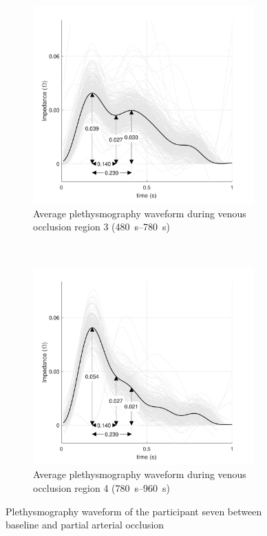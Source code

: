 \begin{figure}[!htbp]
	\centering
	\begin{subfigure}[t]{0.5\textwidth}
		\centering
		\includegraphics[height=7.6cm]{figure8a}
		\caption{Average plethysmography waveform during venous occlusion region 3 (\SIrange{480}{780}{\second})}
		\label{fig:iPG_arterial_baseline}
	\end{subfigure}%
	~ 
	\begin{subfigure}[t]{0.5\textwidth}
		\centering
		\includegraphics[height=7.6cm]{figure8b}
		\caption{Average plethysmography waveform during venous occlusion region 4 (\SIrange{780}{960}{\second})}
		\label{fig:iPG_arterial_occlusion}
	\end{subfigure}
	\caption{Plethysmography waveform of the participant seven between baseline and partial arterial occlusion}
	\label{fig:iPG_arterial}
\end{figure}

